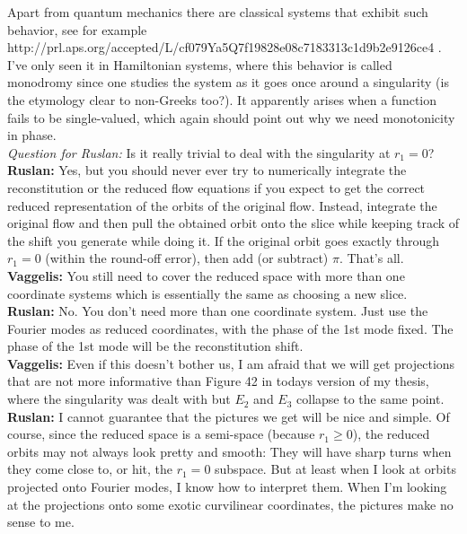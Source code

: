 \documentclass[letter,10pt]{article}
\begin{document}
 Apart from quantum mechanics there are classical systems that exhibit such behavior, see for example http://prl.aps.org/accepted/L/cf079Ya5Q7f19828e08c7183313c1d9b2e9126ce4 . I've only seen it in Hamiltonian systems, where this behavior is called monodromy since one studies the system as it goes once around a singularity (is the etymology clear to non-Greeks too?). It apparently arises when a function fails to be single-valued, which again should point out why we need monotonicity in phase.\\
\textit{Question for Ruslan:} Is it really trivial to deal with the singularity at $r_1=0$?\\
{\bf Ruslan:} Yes, but you should never ever try to numerically integrate the reconstitution or the reduced flow equations if you expect to get the correct reduced representation of the orbits of the original flow.  Instead, integrate the original flow and then pull the obtained orbit onto the slice while keeping track of the shift you generate while doing it.  If the original orbit goes exactly through $r_1 = 0$ (within the round-off error), then add (or subtract) $\pi$.  That's all.\\
{\bf Vaggelis:} You still need to cover the reduced space with more than one coordinate systems which is essentially the same as choosing a new slice.\\
{\bf Ruslan:} No. You don't need more than one coordinate system.  Just use the Fourier modes as reduced coordinates, with the phase of the 1st mode fixed.  The phase of the 1st mode will be the reconstitution shift.\\
{\bf Vaggelis:} Even if this doesn't bother us, I am afraid that we will get projections that are not more informative than Figure 42 in todays version of my thesis, where the singularity was dealt with but $E_2$ and $E_3$ collapse to the same point.\\
{\bf Ruslan:} I cannot guarantee that the pictures we get will be nice and simple.  Of course, since the reduced space is a semi-space (because $r_1 \geq 0$), the reduced orbits may not always look pretty and smooth: They will have sharp turns when they come close to, or hit, the $r_1 = 0$ subspace.  But at least when I look at orbits projected onto Fourier modes, I know how to interpret them.  When I'm looking at the projections onto some exotic curvilinear coordinates, the pictures make no sense to me.






\end{document}
